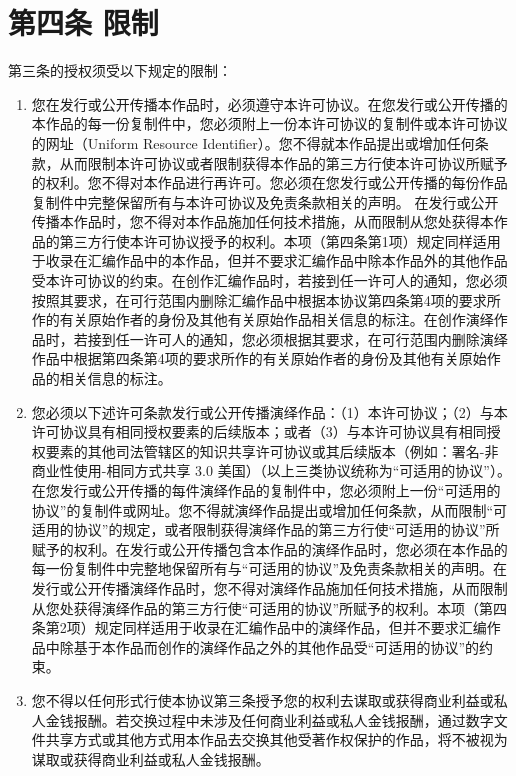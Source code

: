 \documentclass{book}
\begin{document}
\section{第四条 限制}
第三条的授权须受以下规定的限制： 
\begin{enumerate}
	\item 您在发行或公开传播本作品时，必须遵守本许可协议。在您发行或公开传播的本作品的每一份复制件中，您必须附上一份本许可协议的复制件或本许可协议的网址（Uniform Resource Identifier）。您不得就本作品提出或增加任何条款，从而限制本许可协议或者限制获得本作品的第三方行使本许可协议所赋予的权利。您不得对本作品进行再许可。您必须在您发行或公开传播的每份作品复制件中完整保留所有与本许可协议及免责条款相关的声明。 在发行或公开传播本作品时，您不得对本作品施加任何技术措施，从而限制从您处获得本作品的第三方行使本许可协议授予的权利。本项（第四条第1项）规定同样适用于收录在汇编作品中的本作品，但并不要求汇编作品中除本作品外的其他作品受本许可协议的约束。在创作汇编作品时，若接到任一许可人的通知，您必须按照其要求，在可行范围内删除汇编作品中根据本协议第四条第4项的要求所作的有关原始作者的身份及其他有关原始作品相关信息的标注。在创作演绎作品时，若接到任一许可人的通知，您必须根据其要求，在可行范围内删除演绎作品中根据第四条第4项的要求所作的有关原始作者的身份及其他有关原始作品的相关信息的标注。
	\item 您必须以下述许可条款发行或公开传播演绎作品：（1）本许可协议；（2）与本许可协议具有相同授权要素的后续版本；或者（3）与本许可协议具有相同授权要素的其他司法管辖区的知识共享许可协议或其后续版本（例如：署名-非商业性使用-相同方式共享 3.0 美国）（以上三类协议统称为“可适用的协议”）。在您发行或公开传播的每件演绎作品的复制件中，您必须附上一份“可适用的协议”的复制件或网址。您不得就演绎作品提出或增加任何条款，从而限制“可适用的协议”的规定，或者限制获得演绎作品的第三方行使“可适用的协议”所赋予的权利。在发行或公开传播包含本作品的演绎作品时，您必须在本作品的每一份复制件中完整地保留所有与“可适用的协议”及免责条款相关的声明。在发行或公开传播演绎作品时，您不得对演绎作品施加任何技术措施，从而限制从您处获得演绎作品的第三方行使“可适用的协议”所赋予的权利。本项（第四条第2项）规定同样适用于收录在汇编作品中的演绎作品，但并不要求汇编作品中除基于本作品而创作的演绎作品之外的其他作品受“可适用的协议”的约束。 
	\item 您不得以任何形式行使本协议第三条授予您的权利去谋取或获得商业利益或私人金钱报酬。若交换过程中未涉及任何商业利益或私人金钱报酬，通过数字文件共享方式或其他方式用本作品去交换其他受著作权保护的作品，将不被视为谋取或获得商业利益或私人金钱报酬。

\end{enumerate}
\end{document}
